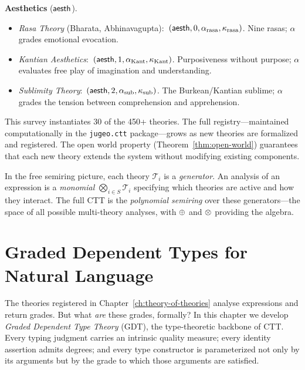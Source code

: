 \noindent\textbf{Aesthetics} ($\mathsf{aesth}$).
\begin{itemize}[nosep]
\item \emph{Rasa Theory} (Bharata, Abhinavagupta):\
  $({\mathsf{aesth}}, 0, \alpha_{\mathrm{rasa}}, \kappa_{\mathrm{rasa}})$.
  Nine rasas; $\alpha$ grades emotional evocation.
\item \emph{Kantian Aesthetics}:\
  $({\mathsf{aesth}}, 1, \alpha_{\mathrm{Kant}}, \kappa_{\mathrm{Kant}})$.
  Purposiveness without purpose; $\alpha$ evaluates free play of
  imagination and understanding.
\item \emph{Sublimity Theory}:\
  $({\mathsf{aesth}}, 2, \alpha_{\mathrm{sub}}, \kappa_{\mathrm{sub}})$.
  The Burkean/Kantian sublime; $\alpha$ grades the tension between
  comprehension and apprehension.
\end{itemize}

\medskip

This survey instantiates 30 of the 450+ theories.  The full
registry---maintained computationally in the \texttt{jugeo.ctt}
package---grows as new theories are formalized and registered.
The open world property (Theorem~\ref{thm:open-world}) guarantees
that each new theory extends the system without modifying existing
components.

\begin{remark}
\label{rem:generators}
In the free semiring picture, each theory $\mathcal{T}_i$ is a
\emph{generator}.  An analysis of an expression is a \emph{monomial}
$\bigotimes_{i \in S} \mathcal{T}_i$ specifying which theories are
active and how they interact.  The full CTT is the \emph{polynomial
semiring} over these generators---the space of all possible
multi-theory analyses, with $\oplus$ and $\otimes$ providing the algebra.
\end{remark}

\chapter{Graded Dependent Types for Natural Language}
\label{ch:gdt}

The theories registered in Chapter~\ref{ch:theory-of-theories} analyse
expressions and return grades.  But what \emph{are} these grades,
formally?  In this chapter we develop \emph{Graded Dependent Type
Theory} (GDT), the type-theoretic backbone of CTT.  Every typing
judgment carries an intrinsic quality measure; every identity
assertion admits degrees; and every type constructor is
parameterized not only by its arguments but by the grade to which
those arguments are satisfied.

